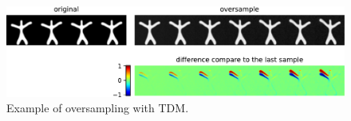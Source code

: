 \begin{figure}[htbp]
    \centering
    \includegraphics[width=0.75\linewidth]{figures/tadm-oversample.pdf}
    \caption{Example of oversampling with TDM.}
    \label{fig:tadm-oversample}
\end{figure}
